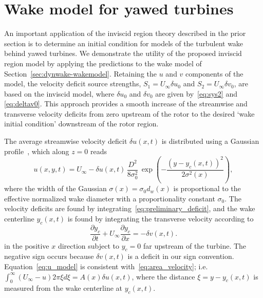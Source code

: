 \section{Wake model for yawed turbines}
\label{sec:yaw-wakemodel}
An important application of the inviscid region theory described in the prior section is to determine an initial condition for models of the turbulent wake behind yawed turbines. We demonstrate the utility of the proposed inviscid region model by applying the predictions to the wake model of Section~\ref{sec:dynwake-wakemodel}.  Retaining the $u$ and $v$ components of the model, the velocity deficit source strengths, $S_1  = U_\infty \delta u_0$ and $S_2 = U_\infty \delta v_0$, are based on the inviscid model, where $\delta u_0$ and  $\delta v_0$ are given by~\eqref{eq:sys2} and \eqref{eq:deltav0}. This approach provides a smooth increase of the streamwise and transverse velocity deficits from zero upstream of the rotor to the desired `wake initial condition' downstream of the rotor region. 

The average streamwise velocity deficit $\delta u(x,t)$ is distributed using a Gaussian profile~\cite{Bastankhah2014a, Bastankhah2016a}, which along $z=0$ reads
\begin{equation}
\label{eq:u_model}
u(x,y,t) = U_\infty - \delta u(x,t) \, \frac{D^2}{8 \sigma_0^2} \,\exp \left(-  \frac{(y-y_c(x,t))^2}{2\sigma^2(x)} \right), 
\end{equation}
where the width of the Gaussian $\sigma(x) = \sigma_0 d_w(x)$ is proportional to the effective normalized wake diameter with a proportionality constant $\sigma_0$. The velocity deficits are found by integrating~\eqref{eq:preliminary_deficit}, and the wake centerline $y_c(x,t)$ is found by integrating the transverse velocity according to
\begin{equation}
\frac{\partial y_c}{\partial t} + U_\infty \frac{\partial y_c}{\partial x} = -\delta v(x,t).
\end{equation}
in the positive $x$ direction subject to $y_c = 0$ far upstream of the turbine. The negative sign occurs because $\delta v(x,t)$ is a deficit in our sign convention. 
Equation~\eqref{eq:u_model} is consistent with~\eqref{eq:area_velocity}; i.e. $\int_{0}^\infty (U_\infty - u) 2\pi \xi d\xi = A(x)\delta u(x,t)$, where the distance $\xi = y-y_c(x,t)$ is measured from the wake centerline at $y_c(x,t)$.
 
